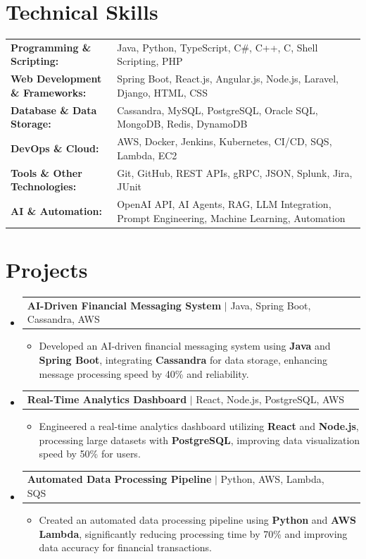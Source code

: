 \documentclass[letterpaper,10pt]{article}
\makeatletter
\newcommand{\resumeItem}[1]{
  \item{\fontsize{8pt}{9pt}\selectfont
    #1 \vspace{-3pt}
  }
}
\newcommand{\resumeProjectHeading}[2]{
    \item
    \begin{tabular*}{1.001\textwidth}{l@{\extracolsep{\fill}}r}
      \fontsize{8.5pt}{10pt}#1 & \textbf{\fontsize{8.5pt}{10pt} #2}\\
    \end{tabular*}\vspace{-7pt}
}
\newcommand{\resumeSubHeadingListStart}{\begin{itemize}[leftmargin=0pt, label={}]}
\newcommand{\resumeSubHeadingListEnd}{\end{itemize}}
\newcommand{\resumeItemListStart}{\begin{itemize}[leftmargin=*]}
\newcommand{\resumeItemListEnd}{\end{itemize}\vspace{-5pt}}
\makeatother
\begin{document}
\section{Technical Skills}
        \vspace{-14pt}
        \begin{table}[h]
            \fontsize{8pt}{9pt}\selectfont
            \begin{tabular}{p{0.3\linewidth} p{0.7\linewidth}}
                \textbf{Programming \& Scripting:} & Java, Python, TypeScript, C\#, C++, C, Shell Scripting, PHP \\
                \textbf{Web Development \& Frameworks:} & Spring Boot, React.js, Angular.js, Node.js, Laravel, Django, HTML, CSS \\
                \textbf{Database \& Data Storage:} & Cassandra, MySQL, PostgreSQL, Oracle SQL, MongoDB, Redis, DynamoDB \\
                \textbf{DevOps \& Cloud:} & AWS, Docker, Jenkins, Kubernetes, CI/CD, SQS, Lambda, EC2 \\
                \textbf{Tools \& Other Technologies:} & Git, GitHub, REST APIs, gRPC, JSON, Splunk, Jira, JUnit \\
                \textbf{AI \& Automation:} & OpenAI API, AI Agents, RAG, LLM Integration, Prompt Engineering, Machine Learning, Automation \\
            \end{tabular}
        \end{table}
 \vspace{-18pt}

\section{Projects}
    \vspace{-5pt}
    \resumeSubHeadingListStart
          \resumeProjectHeading
            {\textbf{AI-Driven Financial Messaging System} $|$ Java, Spring Boot, Cassandra, AWS}{}
            \resumeItemListStart
                \resumeItem{Developed an AI-driven financial messaging system using \textbf{Java} and \textbf{Spring Boot}, integrating \textbf{Cassandra} for data storage, enhancing message processing speed by 40\% and reliability.}
            \resumeItemListEnd
        \vspace{-12pt}
    
        \resumeProjectHeading
            {\textbf{Real-Time Analytics Dashboard} $|$ React, Node.js, PostgreSQL, AWS}{}
        \resumeItemListStart
                \resumeItem{Engineered a real-time analytics dashboard utilizing \textbf{React} and \textbf{Node.js}, processing large datasets with \textbf{PostgreSQL}, improving data visualization speed by 50\% for users.}
        \resumeItemListEnd
      \vspace{-12pt}
      \resumeProjectHeading
        {\textbf{Automated Data Processing Pipeline} $|$ Python, AWS, Lambda, SQS}{}
    \resumeItemListStart
            \resumeItem{Created an automated data processing pipeline using \textbf{Python} and \textbf{AWS Lambda}, significantly reducing processing time by 70\% and improving data accuracy for financial transactions.}
    \resumeItemListEnd
    \resumeSubHeadingListEnd
\end{document}
